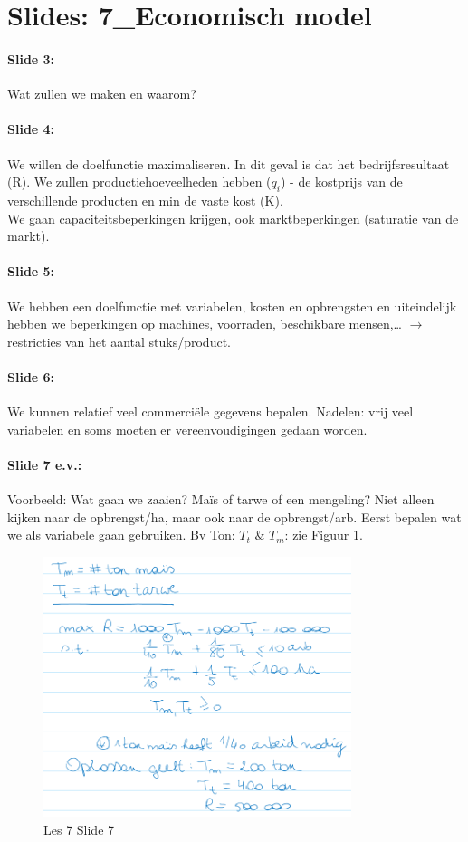 \documentclass[10pt,a4paper]{report}
\begin{document}
\section{Slides: 7\_Economisch model}

\paragraph{Slide 3:} Wat zullen we maken en waarom?

\paragraph{Slide 4:} We willen de doelfunctie maximaliseren. In dit geval is dat het bedrijfsresultaat (R). We zullen productiehoeveelheden hebben ($q_{i}$) - de kostprijs van de verschillende producten en min de vaste kost (K).\\
We gaan capaciteitsbeperkingen krijgen, ook marktbeperkingen (saturatie van de markt).

\paragraph{Slide 5:} We hebben een doelfunctie met variabelen, kosten en opbrengsten en uiteindelijk hebben we beperkingen op machines, voorraden, beschikbare mensen,… $\rightarrow$ restricties van het aantal stuks/product.

\paragraph{Slide 6:} We kunnen relatief veel commerci\"ele gegevens bepalen. Nadelen: vrij veel variabelen en soms moeten er vereenvoudigingen gedaan worden.

\paragraph{Slide 7 e.v.:} Voorbeeld: Wat gaan we zaaien? Ma\"is of tarwe of een mengeling? Niet alleen kijken naar de opbrengst/ha, maar ook naar de opbrengst/arb. Eerst bepalen wat we als variabele gaan gebruiken. Bv Ton: $T_{t}$ $\&$ $T_{m}$: zie Figuur \ref{les07_02}.

\begin{figure}[h!]
\centering
\includegraphics[width=90mm]{Les07_02.png}
\caption{Les 7 Slide 7} 
\label{les07_02}
\end{figure}
\end{document}
